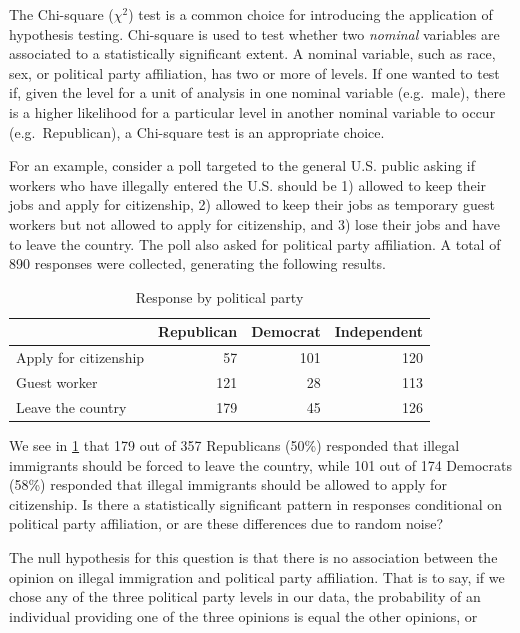 \documentclass[
]{book}
\begin{document}
The Chi-square (\(\chi^2\)) test is a common choice for introducing the application of hypothesis testing. Chi-square is used to test whether two \emph{nominal} variables are associated to a statistically significant extent. A nominal variable, such as race, sex, or political party affiliation, has two or more of levels. If one wanted to test if, given the level for a unit of analysis in one nominal variable (e.g.~male), there is a higher likelihood for a particular level in another nominal variable to occur (e.g.~Republican), a Chi-square test is an appropriate choice.

For an example, consider a poll targeted to the general U.S. public asking if workers who have illegally entered the U.S. should be 1) allowed to keep their jobs and apply for citizenship, 2) allowed to keep their jobs as temporary guest workers but not allowed to apply for citizenship, and 3) lose their jobs and have to leave the country. The poll also asked for political party affiliation. A total of 890 responses were collected, generating the following results.

\begin{table}

\caption{\label{tab:pollparty}Response by political party}
\centering
\begin{tabular}[t]{l|r|r|r}
\hline
  & Republican & Democrat & Independent\\
\hline
Apply for citizenship & 57 & 101 & 120\\
\hline
Guest worker & 121 & 28 & 113\\
\hline
Leave the country & 179 & 45 & 126\\
\hline
\end{tabular}
\end{table}

We see in \ref{tab:pollparty} that 179 out of 357 Republicans (50\%) responded that illegal immigrants should be forced to leave the country, while 101 out of 174 Democrats (58\%) responded that illegal immigrants should be allowed to apply for citizenship. Is there a statistically significant pattern in responses conditional on political party affiliation, or are these differences due to random noise?

The null hypothesis for this question is that there is no association between the opinion on illegal immigration and political party affiliation. That is to say, if we chose any of the three political party levels in our data, the probability of an individual providing one of the three opinions is equal the other opinions, or
\end{document}
